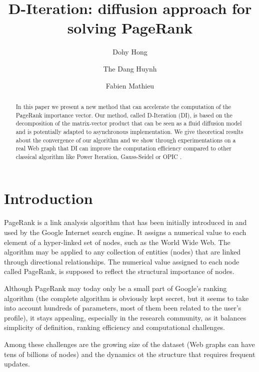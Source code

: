 \documentclass{llncs}
\begin{document}
\title{D-Iteration: diffusion approach for solving PageRank }
  \author{Dohy Hong \and The Dang Huynh
\and Fabien Mathieu}
 

\maketitle              
\begin{abstract}
In this paper we present a new method that can accelerate the computation of the PageRank importance vector. Our method, called D-Iteration (DI), is based on the decomposition of the matrix-vector product that can be seen as a fluid diffusion model and is potentially adapted to asynchronous implementation.
We give theoretical results about the convergence of our algorithm and we show through experimentations on a real Web graph that DI can improve the computation efficiency compared to other classical algorithm like Power Iteration, Gauss-Seidel or OPIC . 
\end{abstract}

\section{Introduction}






PageRank is a link analysis algorithm that has been initially introduced in \cite{BP99} and used by the Google Internet search engine. It assigns a numerical value to each element of a hyper-linked set of nodes, such as the World Wide Web. The algorithm may be applied to any collection of entities (nodes) that are linked through directional relationships. The numerical value assigned to each node called PageRank, is supposed to reflect the structural importance of nodes.

Although PageRank may today only be a small part of Google's ranking algorithm (the complete algorithm is obviously kept secret, but it seems to take into account hundreds of parameters, most of them been related to the user's profile), it stays appealing, especially in the research community, as it balances simplicity of definition, ranking efficiency and computational challenges.

Among these challenges are the growing size of the dataset (Web graphs can have tens of billions of nodes) and the dynamics ot the structure that requires frequent updates.
\end{document}
